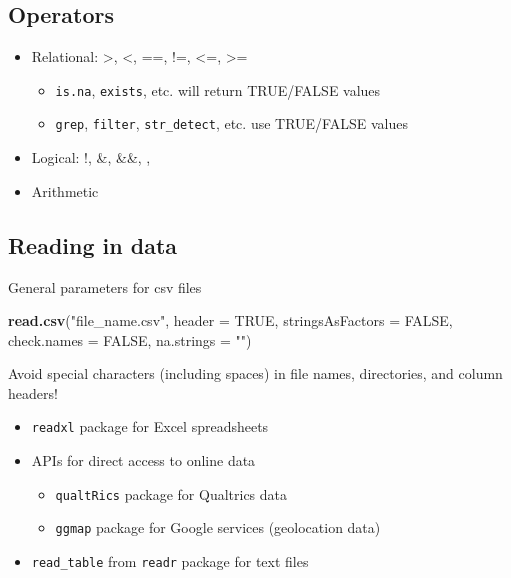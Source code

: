 \documentclass[
]{book}
\newenvironment{Shaded}{\begin{snugshade}}{\end{snugshade}}
\newcommand{\DataTypeTok}[1]{\textcolor[rgb]{0.13,0.29,0.53}{#1}}
\newcommand{\KeywordTok}[1]{\textcolor[rgb]{0.13,0.29,0.53}{\textbf{#1}}}
\newcommand{\NormalTok}[1]{#1}
\newcommand{\OtherTok}[1]{\textcolor[rgb]{0.56,0.35,0.01}{#1}}
\newcommand{\StringTok}[1]{\textcolor[rgb]{0.31,0.60,0.02}{#1}}
\providecommand{\tightlist}{%
  \setlength{\itemsep}{0pt}\setlength{\parskip}{0pt}}
\begin{document}
\hypertarget{operators}{%
\subsection{Operators}\label{operators}}

\begin{itemize}
\tightlist
\item
  Relational: \textgreater, \textless, ==, !=, \textless=, \textgreater=

  \begin{itemize}
  \tightlist
  \item
    \texttt{is.na}, \texttt{exists}, etc. will return TRUE/FALSE values
  \item
    \texttt{grep}, \texttt{filter}, \texttt{str\_detect}, etc. use TRUE/FALSE values
  \end{itemize}
\item
  Logical: !, \&, \&\&, \textbar, \textbar\textbar{}
\item
  Arithmetic
\end{itemize}

\hypertarget{reading-in-data}{%
\subsection{Reading in data}\label{reading-in-data}}

General parameters for csv files

\begin{Shaded}
\begin{Highlighting}[]
\KeywordTok{read.csv}\NormalTok{(}\StringTok{"file_name.csv"}\NormalTok{, }
         \DataTypeTok{header =} \OtherTok{TRUE}\NormalTok{, }
         \DataTypeTok{stringsAsFactors =} \OtherTok{FALSE}\NormalTok{, }
         \DataTypeTok{check.names =} \OtherTok{FALSE}\NormalTok{, }
         \DataTypeTok{na.strings =} \StringTok{""}\NormalTok{)}
\end{Highlighting}
\end{Shaded}

Avoid special characters (including spaces) in file names, directories, and column headers!

\begin{itemize}
\tightlist
\item
  \texttt{readxl} package for Excel spreadsheets
\item
  APIs for direct access to online data

  \begin{itemize}
  \tightlist
  \item
    \texttt{qualtRics} package for Qualtrics data
  \item
    \texttt{ggmap} package for Google services (geolocation data)
  \end{itemize}
\item
  \texttt{read\_table} from \texttt{readr} package for text files
\end{itemize}
\end{document}
